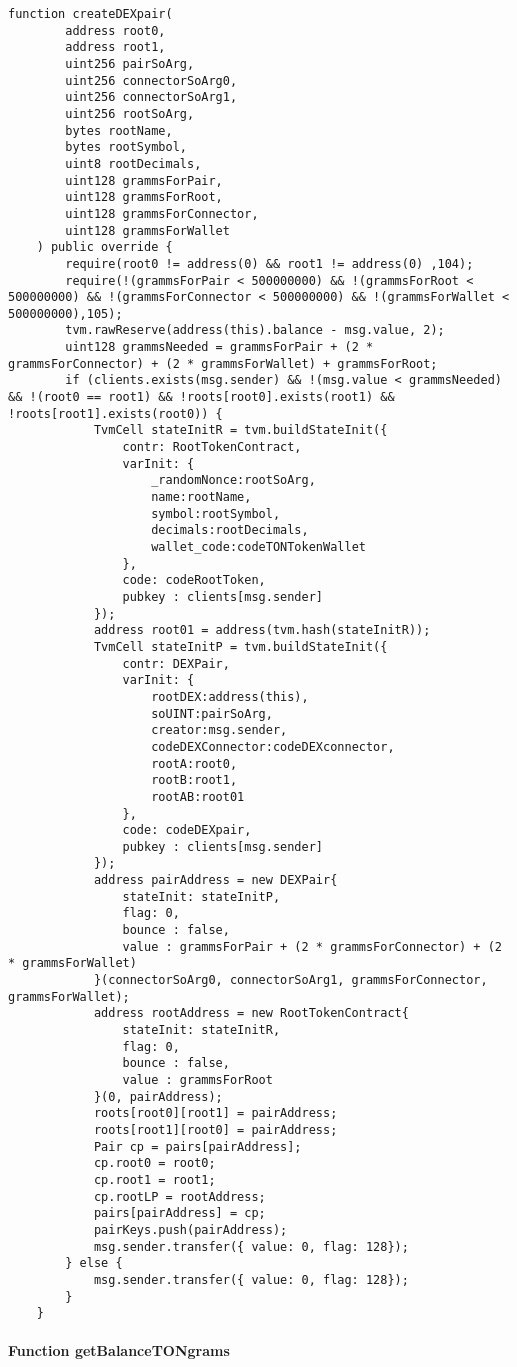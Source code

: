 \vspace{2cm}

\begin{lstlisting}[firstnumber=237]
	function createDEXpair(
		address root0,
		address root1,
		uint256 pairSoArg,
		uint256 connectorSoArg0,
		uint256 connectorSoArg1,
		uint256 rootSoArg,
		bytes rootName,
		bytes rootSymbol,
		uint8 rootDecimals,
		uint128 grammsForPair,
		uint128 grammsForRoot,
		uint128 grammsForConnector,
		uint128 grammsForWallet
	) public override {
		require(root0 != address(0) && root1 != address(0) ,104);
		require(!(grammsForPair < 500000000) && !(grammsForRoot < 500000000) && !(grammsForConnector < 500000000) && !(grammsForWallet < 500000000),105);
		tvm.rawReserve(address(this).balance - msg.value, 2);
		uint128 grammsNeeded = grammsForPair + (2 * grammsForConnector) + (2 * grammsForWallet) + grammsForRoot;
		if (clients.exists(msg.sender) && !(msg.value < grammsNeeded) && !(root0 == root1) && !roots[root0].exists(root1) && !roots[root1].exists(root0)) {
			TvmCell stateInitR = tvm.buildStateInit({
				contr: RootTokenContract,
				varInit: {
					_randomNonce:rootSoArg,
					name:rootName,
					symbol:rootSymbol,
					decimals:rootDecimals,
					wallet_code:codeTONTokenWallet
				},
				code: codeRootToken,
				pubkey : clients[msg.sender]
			});
			address root01 = address(tvm.hash(stateInitR));
			TvmCell stateInitP = tvm.buildStateInit({
				contr: DEXPair,
				varInit: {
					rootDEX:address(this),
					soUINT:pairSoArg,
					creator:msg.sender,
					codeDEXConnector:codeDEXconnector,
					rootA:root0,
					rootB:root1,
					rootAB:root01
				},
				code: codeDEXpair,
				pubkey : clients[msg.sender]
			});
			address pairAddress = new DEXPair{
				stateInit: stateInitP,
				flag: 0,
				bounce : false,
				value : grammsForPair + (2 * grammsForConnector) + (2 * grammsForWallet)
			}(connectorSoArg0, connectorSoArg1, grammsForConnector, grammsForWallet);
			address rootAddress = new RootTokenContract{
				stateInit: stateInitR,
				flag: 0,
				bounce : false,
				value : grammsForRoot
			}(0, pairAddress);
			roots[root0][root1] = pairAddress;
			roots[root1][root0] = pairAddress;
			Pair cp = pairs[pairAddress];
			cp.root0 = root0;
			cp.root1 = root1;
			cp.rootLP = rootAddress;
			pairs[pairAddress] = cp;
			pairKeys.push(pairAddress);
			msg.sender.transfer({ value: 0, flag: 128});
		} else {
			msg.sender.transfer({ value: 0, flag: 128});
		}
	}
\end{lstlisting}

\paragraph{Function getBalanceTONgrams}


